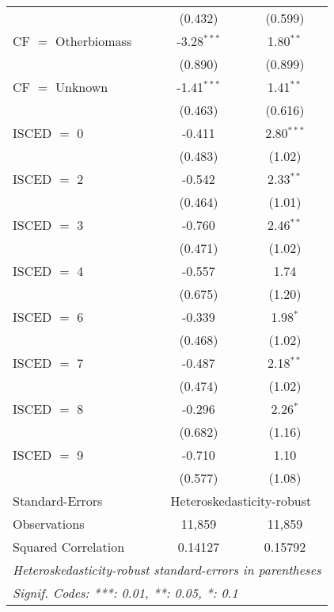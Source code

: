\begin{table}[htbp!]
\begin{adjustbox}{width = 1\textwidth, max height = 0.95\textheight, center}
\begin{threeparttable}[b]
\begin{tabular}{lcc}
                                 & (0.432)       & (0.599)\\   
            CF $=$ Otherbiomass  & -3.28$^{***}$ & 1.80$^{**}$\\   
                                 & (0.890)       & (0.899)\\   
            CF $=$ Unknown       & -1.41$^{***}$ & 1.41$^{**}$\\   
                                 & (0.463)       & (0.616)\\   
            ISCED $=$ 0          & -0.411        & 2.80$^{***}$\\   
                                 & (0.483)       & (1.02)\\   
            ISCED $=$ 2          & -0.542        & 2.33$^{**}$\\   
                                 & (0.464)       & (1.01)\\   
            ISCED $=$ 3          & -0.760        & 2.46$^{**}$\\   
                                 & (0.471)       & (1.02)\\   
            ISCED $=$ 4          & -0.557        & 1.74\\   
                                 & (0.675)       & (1.20)\\   
            ISCED $=$ 6          & -0.339        & 1.98$^{*}$\\   
                                 & (0.468)       & (1.02)\\   
            ISCED $=$ 7          & -0.487        & 2.18$^{**}$\\   
                                 & (0.474)       & (1.02)\\   
            ISCED $=$ 8          & -0.296        & 2.26$^{*}$\\   
                                 & (0.682)       & (1.16)\\   
            ISCED $=$ 9          & -0.710        & 1.10\\   
                                 & (0.577)       & (1.08)\\   
            \midrule 
            Standard-Errors & \multicolumn{2}{c}{Heteroskedasticity-robust} \\ 
            Observations         & 11,859        & 11,859\\  
            Squared Correlation  & 0.14127       & 0.15792\\  
            \midrule \midrule
            \multicolumn{3}{l}{\emph{Heteroskedasticity-robust standard-errors in parentheses}}\\
            \multicolumn{3}{l}{\emph{Signif. Codes: ***: 0.01, **: 0.05, *: 0.1}}\\
         \end{tabular}
         

\end{threeparttable}
\end{adjustbox}
\end{table}
